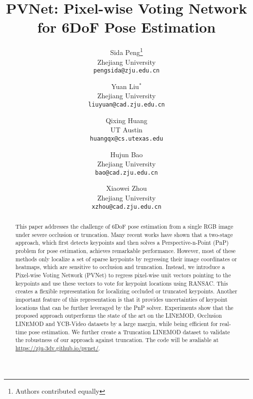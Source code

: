\documentclass[10pt,twocolumn,letterpaper]{article}
\begin{document}
\title{PVNet: Pixel-wise Voting Network for 6DoF Pose Estimation}

\author{
Sida Peng\thanks{Authors contributed equally}\\
Zhejiang University\\
{\tt\small pengsida@zju.edu.cn}
\and
Yuan Liu$^*$\\
Zhejiang University\\
{\tt\small liuyuan@cad.zju.edu.cn}
\and
Qixing Huang\\
UT Austin\\
{\tt\small huangqx@cs.utexas.edu}
\and
Hujun Bao\\
Zhejiang University\\
{\tt\small bao@cad.zju.edu.cn}
\and
Xiaowei Zhou\\
Zhejiang University\\
{\tt\small xzhou@cad.zju.edu.cn}
}

\maketitle

\begin{abstract}
    This paper addresses the challenge of 6DoF pose estimation from a single RGB image under severe occlusion or truncation. Many recent works have shown that a two-stage approach, which first detects keypoints and then solves a Perspective-n-Point (PnP) problem for pose estimation, achieves remarkable performance. However, most of these methods only localize a set of sparse keypoints by regressing their image coordinates or heatmaps, which are sensitive to occlusion and truncation. Instead, we introduce a Pixel-wise Voting Network (PVNet) to regress pixel-wise unit vectors pointing to the keypoints and use these vectors to vote for keypoint locations using RANSAC. This creates a flexible representation for localizing occluded or truncated keypoints. Another important feature of this representation is that it provides uncertainties of keypoint locations that can be further leveraged by the PnP solver. Experiments show that the proposed approach outperforms the state of the art on the LINEMOD, Occlusion LINEMOD and YCB-Video datasets by a large margin, while being efficient for real-time pose estimation. We further create a Truncation LINEMOD dataset to validate the robustness of our approach against truncation. The code will be avaliable at \href{https://zju-3dv.github.io/pvnet/}{https://zju-3dv.github.io/pvnet/}.
\end{abstract}
\end{document}
